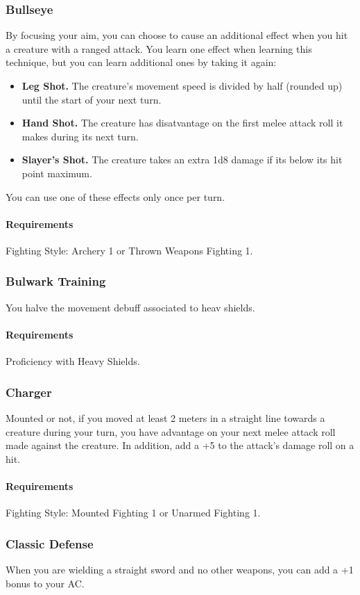 \subsubsection{Bullseye} \label{feat::bullseye}
    By focusing your aim, you can choose to cause an additional effect when you hit a creature with a ranged attack.
    You learn one effect when learning this technique, but you can learn additional ones by taking it again:
    \begin{itemize}
        \item \textbf{Leg Shot.} The creature's movement speed is divided by half (rounded up) until the start of your next turn.
        \item \textbf{Hand Shot.} The creature has disatvantage on the first melee attack roll it makes during its next turn.
        \item \textbf{Slayer's Shot.} The creature takes an extra 1d8 damage if its below its hit point maximum.
    \end{itemize}

    You can use one of these effects only once per turn.
    \paragraph{Requirements} Fighting Style: Archery 1 or Thrown Weapons Fighting 1.
\subsubsection{Bulwark Training} \label{feat::bulwarktraining}
    You halve the movement debuff associated to heav shields.
    \paragraph{Requirements} Proficiency with Heavy Shields.
\subsubsection{Charger} \label{feat::charger}
    Mounted or not, if you moved at least 2 meters in a straight line towards a creature during your turn, you have advantage on your next melee attack roll made against the creature.
    In addition, add a +5 to the attack's damage roll on a hit.
    \paragraph{Requirements} Fighting Style: Mounted Fighting 1 or Unarmed Fighting 1.
\subsubsection{Classic Defense} \label{feat::classicdefense}
    When you are wielding a straight sword and no other weapons, you can add a +1 bonus to your AC.
